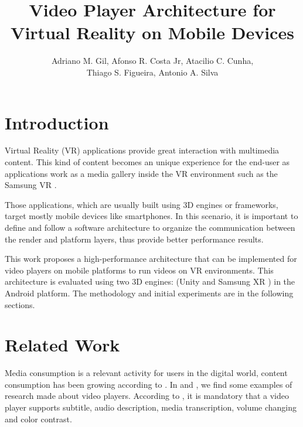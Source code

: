 \documentclass[12pt]{article}
\title{Video Player Architecture for Virtual Reality on Mobile Devices}
\author{Adriano M. Gil, Afonso R. Costa Jr, Atacilio C. Cunha,\\ Thiago S. Figueira, Antonio A. Silva}
\begin{document}
\maketitle

\section{Introduction}

 Virtual Reality (VR) applications provide great interaction with multimedia content. This kind of content becomes an unique experience for the end-user as applications work as a media gallery inside the VR environment such as the Samsung VR \cite{SVR}.

Those applications, which are usually built using 3D engines or frameworks, target mostly mobile devices like smartphones. In this scenario, it is important to define and follow a software architecture to organize the communication between the render and platform layers, thus provide better performance results.

This work proposes a high-performance architecture that can be implemented for video players on mobile platforms to run videos on VR environments. This architecture is evaluated using two 3D engines: (Unity \cite{Unity} and Samsung XR \cite{SXR}) in the Android platform. The methodology and initial experiments are in the following sections.


\section{Related Work}

Media consumption is a relevant activity for users in the digital world, content consumption has been growing according to \cite{repo2004users}. In \cite{hu2018kalgan} and \cite{smolic2009overview}, we find some examples of research made about video players. According to \cite{wild2018inaccessibility}, it is mandatory that a video player supports subtitle, audio description, media transcription, volume changing and color contrast.

\end{document}
